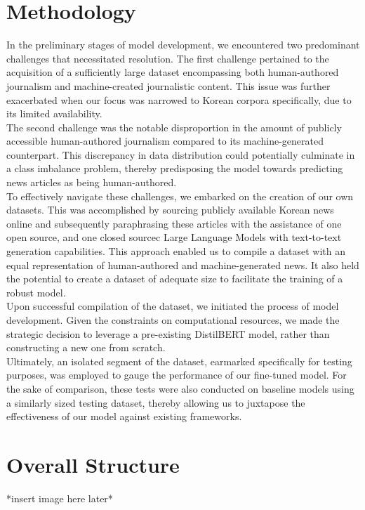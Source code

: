 \documentclass{article}
\begin{document}
\section{Methodology}
\null\quad In the preliminary stages of model development, we encountered two predominant challenges that necessitated resolution.
The first challenge pertained to the acquisition of a sufficiently large dataset encompassing both human-authored journalism and machine-created journalistic content.
This issue was further exacerbated when our focus was narrowed to Korean corpora specifically, due to its limited availability. \\
\null\quad The second challenge was the notable disproportion in the amount of publicly accessible human-authored journalism compared to its machine-generated counterpart.
This discrepancy in data distribution could potentially culminate in a class imbalance problem,
thereby predisposing the model towards predicting news articles as being human-authored. \\
\null\quad To effectively navigate these challenges, we embarked on the creation of our own datasets.
This was accomplished by sourcing publicly available Korean news online and subsequently paraphrasing these articles with the assistance of one open source, and one closed sourcec Large Language Models with text-to-text generation capabilities.
This approach enabled us to compile a dataset with an equal representation of human-authored and machine-generated news.
It also held the potential to create a dataset of adequate size to facilitate the training of a robust model. \\
\null\quad Upon successful compilation of the dataset, we initiated the process of model development.
Given the constraints on computational resources, we made the strategic decision to leverage a pre-existing DistilBERT model, rather than constructing a new one from scratch. \\
\null\quad Ultimately, an isolated segment of the dataset, earmarked specifically for testing purposes, was employed to gauge the performance of our fine-tuned model.
For the sake of comparison, these tests were also conducted on baseline models using a similarly sized testing dataset,
thereby allowing us to juxtapose the effectiveness of our model against existing frameworks.

\section{Overall Structure}
*insert image here later*
\end{document}
